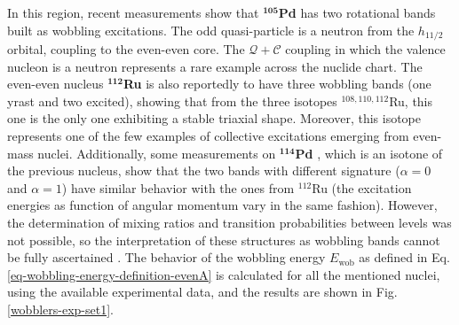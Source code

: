 In this region, recent measurements show that $^\mathbf{105}$\textbf{Pd} \cite{timar2019experimental} has two rotational bands built as wobbling excitations. The odd quasi-particle is a neutron from the $h_{11/2}$ orbital, coupling to the even-even core. The $\mathcal{Q}+\mathscr{C}$ coupling in which the valence nucleon is a neutron represents a rare example across the nuclide chart. The even-even nucleus $^\mathbf{112}$\textbf{Ru} \cite{hamilton2010super} is also reportedly to have three wobbling bands (one yrast and two excited), showing that from the three isotopes $^{108,110,112}$Ru, this one is the only one exhibiting a stable triaxial shape. Moreover, this isotope represents one of the few examples of collective excitations emerging from even-mass nuclei. Additionally, some measurements on $^\mathbf{114}$\textbf{Pd} \cite{luo2013triaxial}, which is an isotone of the previous nucleus, show that the two bands with different signature ($\alpha=0$ and $\alpha=1$) have similar behavior with the ones from $^{112}$Ru (the excitation energies as function of angular momentum vary in the same fashion). However, the determination of mixing ratios and transition probabilities between levels was not possible, so the interpretation of these structures as wobbling bands cannot be fully ascertained \cite{lv2022experimental}. The behavior of the wobbling energy $E_\text{wob}$ as defined in Eq. \ref{eq-wobbling-energy-definition-evenA} is calculated for all the mentioned nuclei, using the available experimental data, and the results are shown in Fig. \ref{wobblers-exp-set1}.
